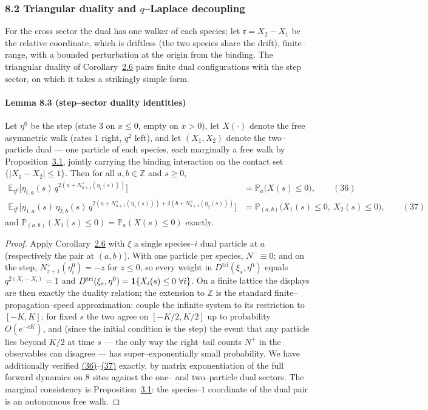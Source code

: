 \documentclass[11pt]{article}
\theoremstyle{plain}
\theoremstyle{definition}
\theoremstyle{remark}
\newcommand{\Z}{\mathbb{Z}}\newcommand{\R}{\mathbb{R}}\newcommand{\N}{\mathbb{N}}
\newcommand{\E}{\mathbb{E}}\newcommand{\PP}{\mathbb{P}}\newcommand{\dd}{\,\mathrm{d}}
\begin{document}
\subsubsection{8.2 Triangular duality and $q$--Laplace decoupling}
For the cross sector the dual has one walker of each species; let
$\mathfrak r=X_2-X_1$ be the relative coordinate, which is driftless (the two species
share the drift), finite--range, with a bounded perturbation at the origin from the
binding. The triangular duality of Corollary~\hyperref[cor_tri]{2.6} pairs finite dual
configurations with the step sector, on which it takes a strikingly simple form.

\paragraph{Lemma 8.3 (step--sector duality identities)}\label{lem_tridual}

Let $\eta^0$ be the step (state $3$ on $x\le0$, empty on $x>0$), let $X(\cdot)$ denote
the free asymmetric walk (rates $1$ right, $q^2$ left), and let $(X_1,X_2)$ denote the
two--particle dual --- one particle of each species, each marginally a free walk by
Proposition~\hyperref[prop_decouple]{3.1}, jointly carrying the binding interaction on the
contact set $\{|X_1-X_2|\le1\}$. Then for all $a,b\in\Z$ and $s\ge0$,
\label{eq_tri1}\label{eq_tri2}
\begin{align}
  \E_{\eta^0}\Big[\eta_{i,a}(s)\,q^{2\left(a+N^+_{a+1}(\eta_i(s))\right)}\Big]
   &=\PP_a\big(X(s)\le0\big),\qquad(36)\\
  \E_{\eta^0}\Big[\eta_{1,a}(s)\,\eta_{2,b}(s)\,
    q^{2\left(a+N^+_{a+1}(\eta_1(s))\right)+2\left(b+N^+_{b+1}(\eta_2(s))\right)}\Big]
   &=\PP_{(a,b)}\big(X_1(s)\le0,\ X_2(s)\le0\big),\qquad(37)\end{align}
and $\PP_{(a,b)}(X_1(s)\le0)=\PP_a(X(s)\le0)$ exactly.
\par
\begin{proof}
Apply Corollary~\hyperref[cor_tri]{2.6} with $\xi$ a single species--$i$ dual particle at $a$
(respectively the pair at $(a,b)$). With one particle per species, $N^-\equiv0$; and
on the step, $N^+_{z+1}(\eta^0_i)=-z$ for $z\le0$, so every weight in
$D^{\mathrm{tri}}(\xi_s,\eta^0)$ equals $q^{2(X_i-X_i)}=1$ and
$D^{\mathrm{tri}}(\xi_s,\eta^0)=\bone\{X_i(s)\le0\ \forall i\}$. On a finite lattice
the displays are then exactly the duality relation; the extension to $\Z$ is the
standard finite--propagation--speed approximation: couple the infinite system to its
restriction to $[-K,K]$; for fixed $s$ the two agree on $[-K/2,K/2]$ up to
probability $O(e^{-cK})$, and (since the initial condition is the step) the event
that any particle lies beyond $K/2$ at time $s$ --- the only way the right--tail
counts $N^+$ in the observables can disagree --- has super--exponentially small
probability. We
have additionally verified \hyperref[eq_tri1]{(36)}--\hyperref[eq_tri2]{(37)} exactly, by matrix
exponentiation of the full forward dynamics on $8$ sites against the one-- and
two--particle dual sectors. The marginal consistency is
Proposition~\hyperref[prop_decouple]{3.1}: the species--$1$ coordinate of the dual pair is an
autonomous free walk.
\end{proof}
\end{document}
